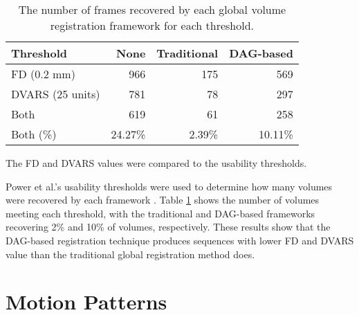 
\begin{table}[th]
\centering
\caption{The number of frames recovered by each global volume registration framework for each threshold.}
\label{tab:thresholds}
\begin{tabular}{|l|r|r|r|}
\hline
\textbf{Threshold} & \textbf{None} & \textbf{Traditional} & \textbf{DAG-based} \\ \hline
FD (0.2 mm)        & 966           & 175                  & 569                \\ \hline
DVARS (25 units)   & 781           & 78                   & 297                \\ \hline
Both               & 619           & 61                   & 258                \\ \hline
Both (\%)          & 24.27\%       & 2.39\%               & 10.11\%            \\ \hline
\end{tabular}
\end{table}


The FD and DVARS values were compared to the usability thresholds. 

Power et al.'s usability thresholds were used to determine how many volumes were recovered by each framework \cite{Power2014}. Table \ref{tab:thresholds} shows the number of volumes meeting each threshold, with the traditional and DAG-based frameworks recovering 2\% and 10\% of volumes, respectively. These results show that the DAG-based registration technique produces sequences with lower FD and DVARS value than the traditional global registration method does.

\section{Motion Patterns}
